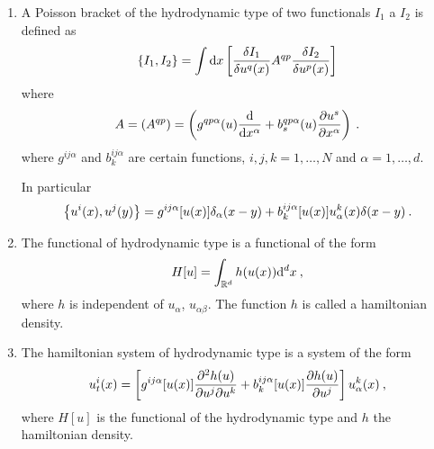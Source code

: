 \begin{definition}
    \begin{enumerate}
        \item A Poisson bracket of the hydrodynamic type of two functionals $I_1$ a $I_2$ is defined as
        \begin{align}
            \left \lbrace I_1,I_2 \right \rbrace = \int \mathrm{d} x 
            \left[ \frac{\delta I_1}{\delta u^q(x)} A^{qp} \frac{\delta I_2}{\delta u^p(x)} \right]
        \end{align}
        where
        \begin{align}
            A = (A^{qp}) = \left( g^{qp \alpha}(u) \frac{\mathrm{d}}{\mathrm{d}x^\alpha} + b^{qp\alpha}_s(u) \frac{\partial u^s}{\partial x^\alpha} \right) \:.
        \end{align}
        where $g^{ij \alpha}$ and $b_k^{ij \alpha}$ are certain functions, $i,j,k = 1, \dots, N$ and $\alpha = 1, \dots, d $.

        In particular
        \begin{align}
            \left \lbrace u^i(x), u^j(y) \right \rbrace = g^{ij \alpha} [u(x)] \delta_\alpha(x-y) + b_k^{ij \alpha} [u(x)] u_\alpha^k(x) \delta(x-y) \:.
        \end{align}
        
        \item The functional of hydrodynamic type is a functional of the form
        \begin{align}
            H[u] = \int_{\mathbb{R}^d} h(u(x)) \mathrm{d}^d x \:,
        \end{align}
        where $h$ is independent of $u_\alpha$, $u_{\alpha \beta}$. The function $h$ is called a hamiltonian density.

        \item The hamiltonian system of hydrodynamic type is a system of the form
        \begin{align}
            u^i_t (x) = 
            \left[ g^{ij \alpha} [u(x)] \frac{\partial^2 h(u)}{\partial u^j \partial u^k} + b_k^{ij \alpha} [u(x)] \frac{\partial h(u)}{\partial u^j} \right] u_\alpha^k(x) \:,
        \end{align}
        where $H[u]$ is the functional of the hydrodynamic type and $h$ the hamiltonian density.
    \end{enumerate}
\end{definition}

